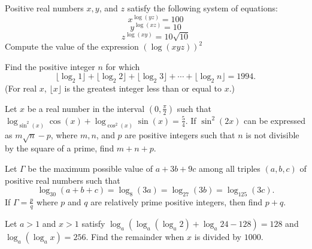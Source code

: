 \documentclass{article}
\begin{document}
\begin{prob}{4}
Positive real numbers $x, y$, and $z$ satisfy the following system of equations:
$$x^{\log(yz)} = 100$$
$$y^{\log(xz)} = 10$$
$$z^{\log(xy)} = 10\sqrt{10}$$
Compute the value of the expression $(\log(xyz))^2$
\end{prob}

\begin{prob}[AIME 1994/4]{4}
Find the positive integer $n$ for which \[ \lfloor \log_2{1}\rfloor+\lfloor\log_2{2}\rfloor+\lfloor\log_2{3}\rfloor+\cdots+\lfloor\log_2{n}\rfloor=1994.  \]  (For real $x$, $\lfloor x\rfloor$ is the greatest integer less than or equal to $x$.)
\end{prob}

\begin{prob}{6}
Let $x$ be a real number in the interval $(0,\frac{\pi}{2})$ such that
$\log_{\sin^2(x)} \cos(x) + \log_{\cos^2(x)} \sin(x) = \frac{5}{4}$.
If $\sin^2(2x)$ can be expressed as $m\sqrt{n} -p$, where $m, n$, and $p$ are positive integers such
that $n$ is not divisible by the square of a prime, find $m + n + p$.
\end{prob}

\begin{prob}{6}
Let $\Gamma$ be the maximum possible value of $a+3b+9c$ among all triples $(a,b,c)$ of positive real numbers such that
\[ \log_{30}(a+b+c) = \log_{8}(3a) = \log_{27} (3b) = \log_{125} (3c) .\]If $\Gamma = \frac{p}{q}$ where $p$ and $q$ are relatively prime positive integers, then find $p+q$.
\end{prob}

\begin{prob}[AIME I 2017/14]{9}
Let $a > 1$ and $x > 1$ satisfy $\log_a(\log_a(\log_a 2) + \log_a 24 - 128) = 128$ and $\log_a(\log_a x) = 256$. Find the remainder when $x$ is divided by $1000$.
\end{prob}
\end{document}
